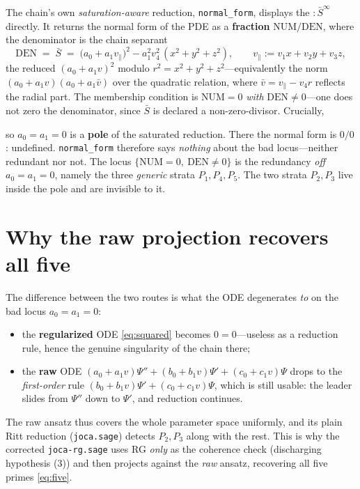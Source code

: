 \documentclass[11pt]{article}
\newcommand{\Sbar}{\bar S}
\newcommand{\code}[1]{\texttt{#1}}
\begin{document}
The chain's own \emph{saturation-aware} reduction, \code{normal\_form}, displays
the $:\Sbar^\infty$ directly. It returns the normal form of the PDE as a
\textbf{fraction} $\mathrm{NUM}/\mathrm{DEN}$, where the denominator is the
chain separant
\begin{equation}
\label{eq:den}
  \mathrm{DEN}\;=\;\Sbar\;=\;\bigl(a_0+a_1v_\parallel\bigr)^2-a_1^2v_4^2\,(x^2{+}y^2{+}z^2),
  \qquad v_\parallel:=v_1x+v_2y+v_3z,
\end{equation}
the reduced $(a_0+a_1v)^2$ modulo $r^2=x^2+y^2+z^2$---equivalently the norm
$(a_0+a_1v)(a_0+a_1\bar v)$ over the quadratic relation, where
$\bar v=v_\parallel-v_4r$ reflects the radial part. The membership condition
is $\mathrm{NUM}=0$ \emph{with} $\mathrm{DEN}\neq0$---one does not zero the
denominator, since $\Sbar$ is declared a non-zero-divisor. Crucially,
\begin{center}
\end{center}
so $a_0=a_1=0$ is a \textbf{pole} of the saturated reduction. There the normal
form is $0/0$: undefined. \code{normal\_form} therefore says \emph{nothing}
about the bad locus---neither redundant nor not. The locus
$\{\mathrm{NUM}=0,\ \mathrm{DEN}\neq0\}$ is the redundancy \emph{off}
$a_0=a_1=0$, namely the three \emph{generic} strata $P_1,P_4,P_5$. The two
strata $P_2,P_3$ live inside the pole and are invisible to it.

\section{Why the raw projection recovers all five}

The difference between the two routes is what the ODE degenerates \emph{to} on
the bad locus $a_0=a_1=0$:
\begin{itemize}
  \item the \textbf{regularized} ODE \eqref{eq:squared} becomes $0=0$---useless
        as a reduction rule, hence the genuine singularity of the chain there;
  \item the \textbf{raw} ODE $(a_0+a_1v)\Psi''+(b_0+b_1v)\Psi'+(c_0+c_1v)\Psi$
        drops to the \emph{first-order} rule $(b_0+b_1v)\Psi'+(c_0+c_1v)\Psi$,
        which is still usable: the leader slides from $\Psi''$ down to $\Psi'$,
        and reduction continues.
\end{itemize}
The raw ansatz thus covers the whole parameter space uniformly, and its
plain Ritt reduction (\code{joca.sage}) detects $P_2,P_3$ along with the rest.
This is why the corrected \code{joca-rg.sage} uses RG \emph{only} as the
coherence check (discharging hypothesis (3)) and then projects against the
\emph{raw} ansatz, recovering all five primes \eqref{eq:five}.
\end{document}
